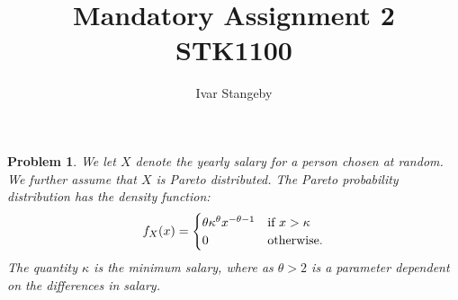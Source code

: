 \documentclass[a4paper, fleqn]{amsart}
\title{
  Mandatory Assignment 2 \\
  STK1100
}
\author{
  Ivar Stangeby
}
\newtheorem{prb}{Problem}
\theoremstyle{definition}
\begin{document}
\maketitle
\begin{prb}
  We let $X$ denote the yearly salary for a person chosen at random. We further
  assume that $X$ is Pareto distributed. The Pareto probability distribution
  has the density function:
  \begin{equation}
    \notag
    f_X(x) = \begin{cases}
      \theta\kappa^{\theta}x^{-\theta - 1} & \text{if } x > \kappa \\
      0 & \text{otherwise}.
    \end{cases}
  \end{equation}
  The quantity $\kappa$ is the minimum salary, where as $\theta > 2$ is a
  parameter dependent on the differences in salary.
\end{prb}
\end{document}
